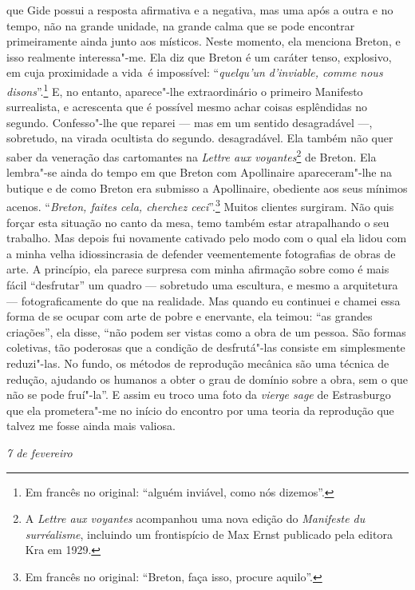 que Gide possui a resposta afirmativa e a negativa, mas uma após a outra
e no tempo, não na grande unidade, na grande calma que se pode encontrar
primeiramente ainda junto aos místicos. Neste momento, ela menciona
Breton, e isso realmente interessa"-me. Ela diz que Breton é um caráter
tenso, explosivo, em cuja proximidade a vida~é impossível:
``\emph{quelqu'un d'inviable, comme nous disons}''.\footnote{Em francês no original: ``alguém inviável, como nós dizemos''. \versal{[N.~T.]}} E, no entanto,
aparece"-lhe extraordinário o primeiro Manifesto surrealista, e acrescenta que é possível mesmo achar coisas esplêndidas no segundo. Confesso"-lhe que
reparei --- mas em um sentido desagradável ---, sobretudo, na virada ocultista do segundo.
desagradável. Ela também não quer saber da veneração das cartomantes na
\emph{Lettre aux voyantes}\footnote{A \emph{Lettre aux voyantes}
  acompanhou uma nova edição do \emph{Manifeste du surréalisme},
  incluindo um frontispício de Max Ernst publicado pela editora Kra em
  1929. \versal{[N.~O.]}} de Breton. Ela lembra"-se ainda do tempo em que Breton com
Apollinaire apareceram"-lhe na butique e de como Breton era submisso a
Apollinaire, obediente aos seus mínimos acenos. ``\emph{Breton, faites
cela, cherchez ceci}''.\footnote{Em francês no original: ``Breton, faça isso, procure
  aquilo''. \versal{[N.~T.]}} Muitos clientes surgiram. Não quis
forçar esta situação no canto da mesa, temo também estar atrapalhando
o seu trabalho. Mas depois fui novamente cativado pelo modo com o qual
ela lidou com a minha velha idiossincrasia de defender veementemente fotografias de obras de arte. A princípio, ela parece surpresa com minha
afirmação sobre como é mais fácil ``desfrutar'' um quadro --- sobretudo uma
escultura, e mesmo a arquitetura --- fotograficamente do que na
realidade. Mas quando eu continuei e chamei essa forma de se ocupar com
arte de pobre e enervante, ela teimou: ``as grandes criações'', ela disse,
``não podem ser vistas como a obra de um pessoa. São formas coletivas,
tão poderosas que a condição de desfrutá"-las consiste em simplesmente
reduzi"-las. No fundo, os métodos de reprodução mecânica são uma técnica
de redução, ajudando os humanos a obter o grau de domínio sobre a obra,
sem o que não se pode fruí"-la''. E assim eu troco uma foto da
\emph{vierge sage} de Estrasburgo que ela prometera"-me no início do
encontro por uma teoria da reprodução que talvez me fosse ainda mais
valiosa.

\pagebreak

\begin{flushright}
\emph{7 de fevereiro}
\end{flushright}

